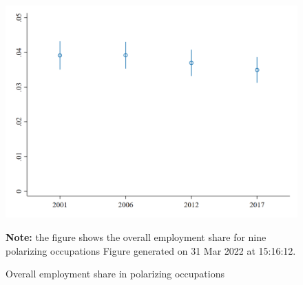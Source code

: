\begin{figure}[!h]
\centering
\caption{Overall employment share in polarizing occupations}
\includegraphics[width=.5\textwidth]{../results/figures//empshare_in_polarizing_occupations.png}
\par \begin{minipage}[h]{\textwidth}{\scriptsize\textbf{Note:} the figure shows the overall employment share for nine polarizing occupations Figure generated on 31 Mar 2022 at 15:16:12.}\end{minipage}
\end{figure}

